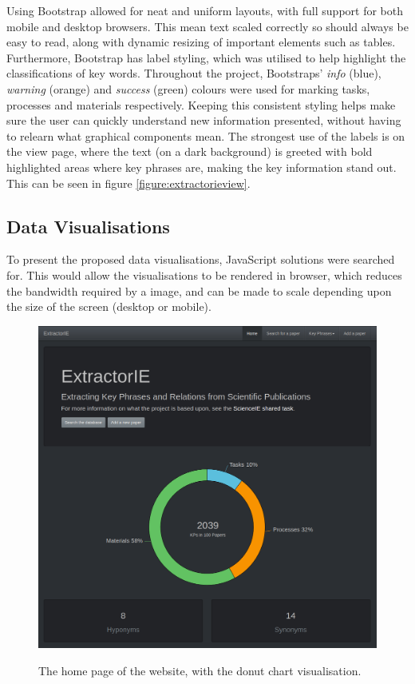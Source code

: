 Using Bootstrap allowed for neat and uniform layouts, with full support for both mobile and desktop browsers. This mean text scaled correctly so should always be easy to read, along with dynamic resizing of important elements such as tables. Furthermore, Bootstrap has label styling, which was utilised to help highlight the classifications of key words. Throughout the project, Bootstraps' \textit{info} (blue), \textit{warning} (orange) and \textit{success} (green) colours were used for marking tasks, processes and materials respectively. Keeping this consistent styling helps make sure the user can quickly understand new information presented, without having to relearn what graphical components mean. The strongest use of the labels is on the view page, where the text (on a dark background) is greeted with bold highlighted areas where key phrases are, making the key information stand out. This can be seen in figure \ref{figure:extractorieview}.

\subsection*{Data Visualisations}
To present the proposed data visualisations, JavaScript solutions were searched for. This would allow the visualisations to be rendered in browser, which reduces the bandwidth required by a image, and can be made to scale depending upon the size of the screen (desktop or mobile).

\begin{figure}[t]
	\centering
	\includegraphics[width=12cm]{img/extractorie-home.png} \\
	\caption[The Home Page of the Website]{The home page of the website, with the donut chart visualisation.}
	\label{figure:extractoriehome}
\end{figure}

